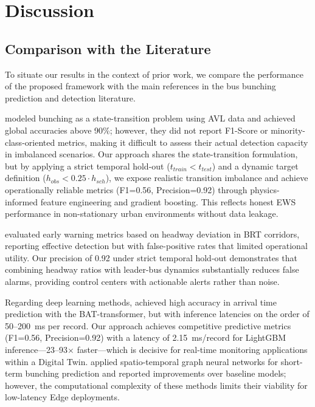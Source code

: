 \documentclass[fleqn,10pt,lineno]{wlpeerj}
\begin{document}
\section{Discussion}
\label{sec:discussion}

\subsection{Comparison with the Literature}

To situate our results in the context of prior work, we compare the performance of the proposed
framework with the main references in the bus bunching prediction and detection literature.

\citet{3} modeled bunching as a state-transition problem using AVL data and achieved global
accuracies above 90\%; however, they did not report F1-Score or minority-class-oriented metrics,
making it difficult to assess their actual detection capacity in imbalanced scenarios. Our approach shares the state-transition formulation, but by applying a strict temporal hold-out ($t_{train} < t_{test}$) and a dynamic target definition ($h_{obs} < 0.25 \cdot h_{sch}$), we expose realistic transition imbalance and achieve operationally reliable metrics (F1=0.56, Precision=0.92) through physics-informed feature engineering and gradient boosting. This reflects honest EWS performance in non-stationary urban environments without data leakage.

\citet{8} evaluated early warning metrics based on headway deviation in BRT corridors, reporting
effective detection but with false-positive rates that limited operational utility. Our precision of 0.92 under strict temporal hold-out demonstrates that combining headway ratios with leader-bus dynamics substantially reduces false alarms, providing control centers with actionable alerts rather than noise.

Regarding deep learning methods, \citet{19} achieved high accuracy in arrival time prediction
with the BAT-transformer, but with inference latencies on the order of 50--200~ms per record.
Our approach achieves competitive predictive metrics (F1=0.56, Precision=0.92) with a latency of 2.15~ms/record for LightGBM inference---23--93$\times$ faster---which
is decisive for real-time monitoring applications within a Digital Twin. \citet{30} applied
spatio-temporal graph neural networks for short-term bunching prediction and reported
improvements over baseline models; however, the computational complexity of these methods
limits their viability for low-latency Edge deployments.
\end{document}
